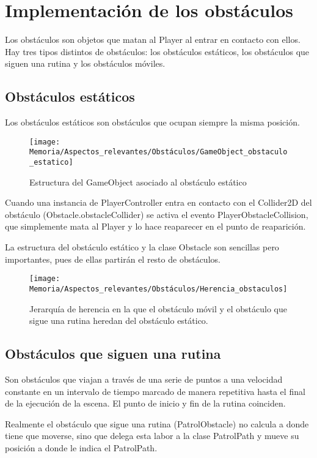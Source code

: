 \section{Implementación de los obstáculos}
Los obstáculos son objetos que matan al Player al entrar en contacto con ellos. Hay tres tipos distintos de obstáculos: los obstáculos estáticos, los obstáculos que siguen una rutina y los obstáculos móviles.

\subsection{Obstáculos estáticos}
Los obstáculos estáticos son obstáculos que ocupan siempre la misma posición.

\begin{figure}[h]
\centering
\texttt{[image: Memoria/Aspectos\_relevantes/Obstáculos/GameObject\_obstaculo\_estatico]}
\caption{Estructura del GameObject asociado al obstáculo estático}
\end{figure}

Cuando una instancia de PlayerController entra en contacto con el Collider2D del obstáculo (Obstacle.obstacleCollider) se activa el evento PlayerObstacleCollision, que simplemente mata al Player y lo hace reaparecer en el punto de reaparición.

La estructura del obstáculo estático y la clase Obstacle son sencillas pero importantes, pues de ellas partirán el resto de obstáculos.

\begin{figure}[h]
\centering
\texttt{[image: Memoria/Aspectos\_relevantes/Obstáculos/Herencia\_obstaculos]}
\caption{Jerarquía de herencia en la que el obstáculo móvil y el obstáculo que sigue una rutina heredan del obstáculo estático.}
\end{figure}

\subsection{Obstáculos que siguen una rutina}
Son obstáculos que viajan a través de una serie de puntos a una velocidad constante en un intervalo de tiempo marcado de manera repetitiva hasta el final de la ejecución de la escena. El punto de inicio y fin de la rutina coinciden. 

Realmente el obstáculo que sigue una rutina (PatrolObstacle) no calcula a donde tiene que moverse, sino que delega esta labor a la clase PatrolPath y mueve su posición a donde le indica el PatrolPath.

